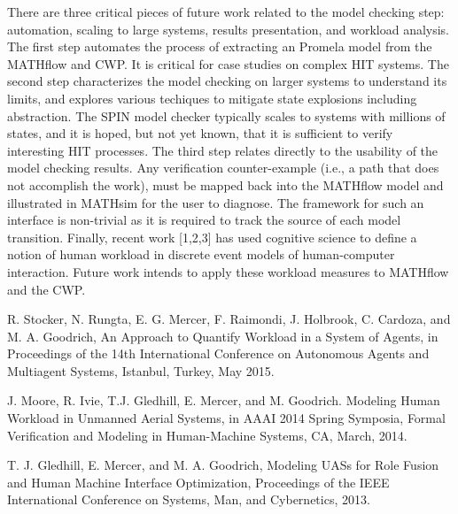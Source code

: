 There are three critical pieces of future work related to the model checking step: automation, scaling to large systems, results presentation, and workload analysis. The first step automates the process of extracting an Promela model from the MATHflow and CWP. It is critical for case studies on complex HIT systems. The second step characterizes the model checking on larger systems to understand its limits, and explores various techiques to mitigate state explosions including abstraction. The SPIN model checker typically scales to systems with millions of states, and it is hoped, but not yet known, that it is sufficient to verify interesting HIT processes. The third step relates directly to the usability of the model checking results. Any verification counter-example (i.e., a path that does not accomplish the work), must be mapped back into the MATHflow model and illustrated in MATHsim for the user to diagnose. The framework for such an interface is non-trivial as it is required to track the source of each model transition. Finally, recent work [1,2,3] has used cognitive science to define a notion of human workload in discrete event models of human-computer interaction. Future work intends to apply these workload measures to MATHflow and the CWP.


R. Stocker, N. Rungta, E. G. Mercer, F. Raimondi, J. Holbrook, C. Cardoza, and M. A. Goodrich, An Approach to Quantify Workload in a System of Agents, in Proceedings of the 14th International Conference on Autonomous Agents and Multiagent Systems, Istanbul, Turkey, May 2015.

J. Moore, R. Ivie, T.J. Gledhill, E. Mercer, and M. Goodrich. Modeling Human Workload in Unmanned Aerial Systems, in AAAI 2014 Spring Symposia, Formal Verification and Modeling in Human-Machine Systems, CA, March, 2014.

T. J. Gledhill, E. Mercer, and M. A. Goodrich, Modeling UASs for Role Fusion and Human Machine Interface Optimization, Proceedings of the IEEE International Conference on Systems, Man, and Cybernetics, 2013.
